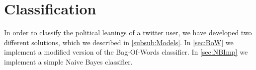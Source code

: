 \chapter{Classification}\label{cha:classification}

In order to classify the political leanings of a twitter user, we have
developed two different solutions, which we described in
\autoref{subsub:Models}. In \autoref{sec:BoW} we implement a modified version of
the Bag-Of-Words classifier. In \autoref{sec:NBImp} we implement a simple Naive
Bayes classifier.
